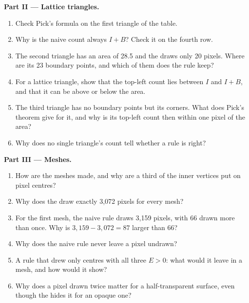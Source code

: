 \begin{problem}
\medskip\noindent\textbf{Part II --- Lattice triangles.}
\begin{enumerate}[resume]
  \item Check Pick's formula on the first triangle of the table.
  \item Why is the naive count always $I + B$? Check it on the fourth row.
  \item The second triangle has an area of 28.5 and the  draws only 20 pixels. Where are its 23 boundary points, and which of them does the rule keep?
  \item For a lattice triangle, show that the top-left count lies between $I$ and $I + B$, and that it can be above or below the area.
  \item The third triangle has no boundary points but its corners. What does Pick's theorem give for it, and why is its top-left count then within one pixel of the area?
  \item Why does no single triangle's count tell whether a rule is right?
\end{enumerate}

\medskip\noindent\textbf{Part III --- Meshes.}
\begin{enumerate}[resume]
  \item How are the meshes made, and why are a third of the inner vertices put on pixel centres?
  \item Why does the  draw exactly 3,072 pixels for every mesh?
  \item For the first mesh, the naive rule draws 3,159 pixels, with 66 drawn more than once. Why is $3{,}159 - 3{,}072 = 87$ larger than 66?
  \item Why does the naive rule never leave a pixel undrawn?
  \item A rule that drew only centres with all three $E > 0$: what would it leave in a mesh, and how would it show?
  \item Why does a pixel drawn twice matter for a half-transparent surface, even though the  hides it for an opaque one?
\end{enumerate}


\end{problem}
